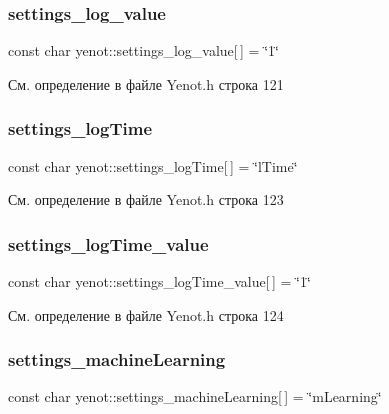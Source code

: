 \subsubsection{\texorpdfstring{settings\+\_\+log\+\_\+value}{settings\_log\_value}}
{\footnotesize\ttfamily const char yenot\+::settings\+\_\+log\+\_\+value\mbox{[}$\,$\mbox{]} = \char`\"{}1\char`\"{}}



См. определение в файле Yenot.\+h строка 121

\mbox{\label{namespaceyenot_af1e97f87e798dc626f1a437f23b42199}} 
\subsubsection{\texorpdfstring{settings\+\_\+log\+Time}{settings\_logTime}}
{\footnotesize\ttfamily const char yenot\+::settings\+\_\+log\+Time\mbox{[}$\,$\mbox{]} = \char`\"{}l\+Time\char`\"{}}



См. определение в файле Yenot.\+h строка 123

\mbox{\label{namespaceyenot_aa1103de8317b20c60b2ae5da7e05f2b3}} 
\subsubsection{\texorpdfstring{settings\+\_\+log\+Time\+\_\+value}{settings\_logTime\_value}}
{\footnotesize\ttfamily const char yenot\+::settings\+\_\+log\+Time\+\_\+value\mbox{[}$\,$\mbox{]} = \char`\"{}1\char`\"{}}



См. определение в файле Yenot.\+h строка 124

\mbox{\label{namespaceyenot_a9e0a7decaab1ac67fda9bba816d240ad}} 
\subsubsection{\texorpdfstring{settings\+\_\+machine\+Learning}{settings\_machineLearning}}
{\footnotesize\ttfamily const char yenot\+::settings\+\_\+machine\+Learning\mbox{[}$\,$\mbox{]} = \char`\"{}m\+Learning\char`\"{}}



